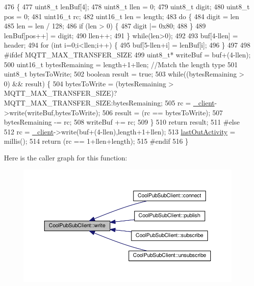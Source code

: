 \begin{DoxyCode}
476                                                                              \{
477     uint8\_t lenBuf[4];
478     uint8\_t llen = 0;
479     uint8\_t digit;
480     uint8\_t pos = 0;
481     uint16\_t rc;
482     uint16\_t len = length;
483     \textcolor{keywordflow}{do} \{
484         digit = len %
485         len = len / 128;
486         \textcolor{keywordflow}{if} (len > 0) \{
487             digit |= 0x80;
488         \}
489         lenBuf[pos++] = digit;
490         llen++;
491     \} \textcolor{keywordflow}{while}(len>0);
492 
493     buf[4-llen] = header;
494     \textcolor{keywordflow}{for} (\textcolor{keywordtype}{int} i=0;i<llen;i++) \{
495         buf[5-llen+i] = lenBuf[i];
496     \}
497 
498 \textcolor{preprocessor}{#ifdef MQTT\_MAX\_TRANSFER\_SIZE}
499     uint8\_t* writeBuf = buf+(4-llen);
500     uint16\_t bytesRemaining = length+1+llen;  \textcolor{comment}{//Match the length type}
501     uint8\_t bytesToWrite;
502     \textcolor{keywordtype}{boolean} result = \textcolor{keyword}{true};
503     \textcolor{keywordflow}{while}((bytesRemaining > 0) && result) \{
504         bytesToWrite = (bytesRemaining > MQTT\_MAX\_TRANSFER\_SIZE)?MQTT\_MAX\_TRANSFER\_SIZE:bytesRemaining;
505         rc = \hyperlink{class_cool_pub_sub_client_a487a65bafb6e3b8e9ab544b13a8878a0}{\_client}->write(writeBuf,bytesToWrite);
506         result = (rc == bytesToWrite);
507         bytesRemaining -= rc;
508         writeBuf += rc;
509     \}
510     \textcolor{keywordflow}{return} result;
511 \textcolor{preprocessor}{#else}
512     rc = \hyperlink{class_cool_pub_sub_client_a487a65bafb6e3b8e9ab544b13a8878a0}{\_client}->write(buf+(4-llen),length+1+llen);
513     \hyperlink{class_cool_pub_sub_client_a8930f17c8a384f2e7600b5b854d67506}{lastOutActivity} = millis();
514     \textcolor{keywordflow}{return} (rc == 1+llen+length);
515 \textcolor{preprocessor}{#endif}
516 \}
\end{DoxyCode}
Here is the caller graph for this function\+:\nopagebreak
\begin{figure}[H]
\begin{center}
\leavevmode
\includegraphics[width=350pt]{d8/d4b/class_cool_pub_sub_client_a7a8e4854a1846eaa668046d3854d47ad_icgraph}
\end{center}
\end{figure}
\mbox{\label{class_cool_pub_sub_client_a0e3d7e776d4cf4427f9569b28868905a}} 
